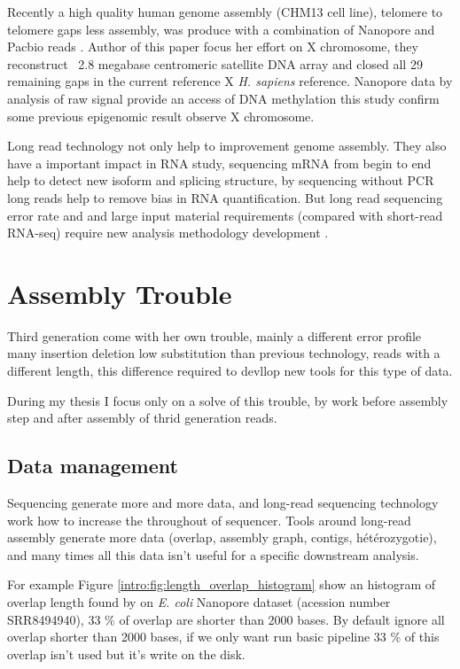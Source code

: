 \documentclass[./main.tex]{subfiles}
\begin{document}
Recently a high quality human genome assembly (CHM13 cell line), telomere to telomere gaps less assembly, was produce with a combination of Nanopore and Pacbio reads \cite{telomere2telomere}. Author of this paper focus her effort on X chromosome, they reconstruct ~2.8 megabase centromeric satellite DNA array and closed all 29 remaining gaps in the current reference X \textit{H. sapiens} reference. Nanopore data by analysis of raw signal provide an access of DNA methylation this study confirm some previous epigenomic result observe X chromosome.

Long read technology not only help to improvement genome assembly. They also have a important impact in RNA study, sequencing mRNA from begin to end help to detect new isoform and splicing structure, by sequencing without PCR long reads help to remove bias in RNA quantification. But long read sequencing error rate and and large input material requirements (compared with short-read RNA-seq) require new analysis methodology development \cite{review_lr_rna}. 

\section{Assembly Trouble}

Third generation come with her own trouble, mainly a different error profile many insertion deletion low substitution than previous technology, reads with a different length, this difference required to devllop new tools for this type of data.

During my thesis I focus only on a solve of this trouble, by work before assembly step and after assembly of thrid generation reads.

\subsection{Data management}

Sequencing generate more and more data, and long-read sequencing technology work how to increase the throughout of sequencer. Tools around long-read assembly generate more data (overlap, assembly graph, contigs, hétérozygotie), and many times all this data isn't useful for a specific downstream analysis.

For example Figure \ref{intro:fig:length_overlap_histogram} show an histogram of overlap length found by \minimap on \textit{E. coli} Nanopore dataset (acession number SRR8494940), 33 \% of overlap are shorter than 2000 bases. By default \miniasm ignore all overlap shorter than 2000 bases, if we only want run basic \miniasm pipeline 33 \% of this overlap isn't used but it's write on the disk.
\end{document}
